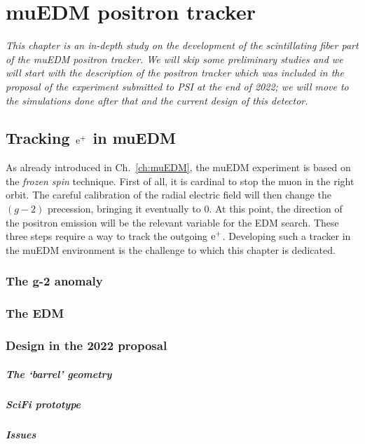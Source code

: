 \chapter{muEDM positron tracker}
\label{ch:muEDM:tracker}
\begin{refsection}
{\itshape This chapter is an in-depth study on the development of the scintillating fiber part of the muEDM positron tracker. 
We will skip some preliminary studies and we will start with the description of the positron tracker which was included in the proposal of the experiment submitted to PSI at the end of 2022; we will move to the simulations done after that and the current design of this detector.}

\section{Tracking $\text{e}^+$ in muEDM}
    As already introduced in Ch.~\ref{ch:muEDM}, the muEDM experiment is based on the \textit{frozen spin} technique.
    First of all, it is cardinal to stop the muon in the right orbit. 
    The careful calibration of the radial electric field will then change the $(g-2)$ precession, bringing it eventually to 0.
    At this point, the direction of the positron emission will be the relevant variable for the EDM search.
    These three steps require a way to track the outgoing $\text{e}^+$.
    Developing such a tracker in the muEDM environment is the challenge to which this chapter is dedicated.
    
    \subsection{The g-2 anomaly}
    \subsection{The EDM}
    \subsection{Design in the 2022 proposal}
    \paragraph{The `barrel' geometry}
    \paragraph{SciFi prototype}
    \paragraph{Issues}

\end{refsection}
